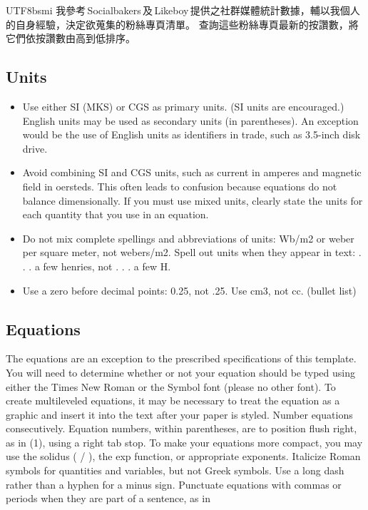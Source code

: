 \documentclass[letterpaper, 10pt, conference]{ieeeconf}   %
\begin{document}
\begin{CJK*}{UTF8}{bsmi}
我參考\,Socialbakers\,及\,Likeboy\,提供之社群媒體統計數據，輔以我個人的自身經驗，決定欲蒐集的粉絲專頁清單。
查詢這些粉絲專頁最新的按讚數，將它們依按讚數由高到低排序。

\subsection{Units}

\begin{itemize}

\item Use either SI (MKS) or CGS as primary units. (SI units are encouraged.) English units may be used as secondary units (in parentheses). An exception would be the use of English units as identifiers in trade, such as 3.5-inch disk drive.
\item Avoid combining SI and CGS units, such as current in amperes and magnetic field in oersteds. This often leads to confusion because equations do not balance dimensionally. If you must use mixed units, clearly state the units for each quantity that you use in an equation.
\item Do not mix complete spellings and abbreviations of units: Wb/m2 or weber per square meter, not webers/m2.  Spell out units when they appear in text: . . . a few henries, not . . . a few H.
\item Use a zero before decimal points: 0.25, not .25. Use cm3, not cc. (bullet list)

\end{itemize}


\subsection{Equations}

The equations are an exception to the prescribed specifications of this template. You will need to determine whether or not your equation should be typed using either the Times New Roman or the Symbol font (please no other font). To create multileveled equations, it may be necessary to treat the equation as a graphic and insert it into the text after your paper is styled. Number equations consecutively. Equation numbers, within parentheses, are to position flush right, as in (1), using a right tab stop. To make your equations more compact, you may use the solidus ( / ), the exp function, or appropriate exponents. Italicize Roman symbols for quantities and variables, but not Greek symbols. Use a long dash rather than a hyphen for a minus sign. Punctuate equations with commas or periods when they are part of a sentence, as in


\end{CJK*}
\end{document}
